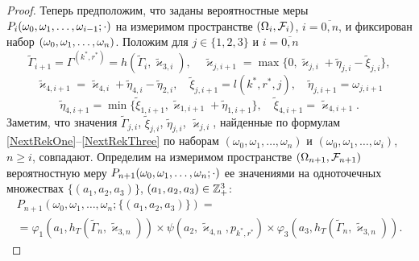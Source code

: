 \documentclass[12pt]{extarticle}
\theoremstyle{theorem}
\theoremstyle{remark}
\renewcommand*{\hm}[1]{#1\nobreak\discretionary{}%
	{\hbox{$\mathsurround=0pt #1$}}{}}%
\begin{document}
\begin{proof}
Теперь предположим, что заданы вероятностные меры $P_i(\omega_0\hm{}, \omega_1,\hm{} \ldots \hm{}, \omega_{i-1};\cdot)$ на измеримом пространстве $(\Omega_i, {\cal F}_i)$, $i=\overline{0,n}$,
и 
фиксирован набор $(\omega_0, \omega_1, \hm\ldots, \omega_{n})$. Положим для $j\in \{1, 2, 3\}$  и $i=\overline{0,n}$
\begin{equation}
\tilde{\Gamma}_{i+1}=\Gamma^{(k^*,r^*)}=h(\tilde{\Gamma}_{i},\tilde{\varkappa}_{3,i}), \quad \tilde{\varkappa}_{j,i+1}=\max\{ 0,\tilde{\varkappa}_{j,i}+\tilde{\eta}_{j,i} -\tilde{\xi}_{j,i}\},
\label{NextRekOne}
\end{equation}
\begin{equation}
\tilde{\varkappa}_{4,i+1}=\tilde{\varkappa}_{4,i}+\tilde{\eta}_{4,i}-\tilde{\eta}_{2,i}, \quad \tilde{\xi}_{j,i+1}=l(k^*,r^*,j),\quad \tilde{\eta}_{j,i+1}=\omega_{j,i+1}
\label{NextRekTwo}
\end{equation}
\begin{equation}
\tilde{\eta}_{4,i+1}=\min\{\tilde{\xi}_{1,i+1}, \tilde{\varkappa}_{1,i+1}+\tilde{\eta}_{1,i+1}\}, \quad \tilde{\xi}_{4,i+1}=\tilde{\varkappa}_{4,i+1}.
\label{NextRekThree}
\end{equation}
Заметим, что значения $\tilde{\Gamma}_{j,i}$, $\tilde\xi_{j,i}$, $\tilde\eta_{j,i}$, $\tilde\varkappa_{j,i}$, найденные по формулам \eqref{NextRekOne}--\eqref{NextRekThree} по наборам $(\omega_0, \omega_1,\ldots, \omega_n)$ и $(\omega_0, \omega_1,\ldots, \omega_i)$, $n\geqslant i$, совпадают.
Определим на измеримом пространстве $(\Omega_{n+1}, {\cal F}_{n+1})$ вероятностную меру  $P_{n+1}(\omega_0, \omega_1, \hm\ldots, \omega_n;\cdot)$
ее значениями на одноточечных множествах $\{(a_1,a_2,a_3)\}$, $(a_1,a_2,a_3)\hm\in {\mathbb Z}_+^3$:
\begin{multline}
P_{n+1}(\omega_0,\omega_1,\ldots,\omega_n;\{(a_1,a_2,a_3)\}) = \\
= \varphi_1(a_1,h_T(\tilde{\Gamma}_n,\tilde{\varkappa}_{3,n})) \times \psi(a_2,\tilde{\varkappa}_{4,n}, p_{k^*,r^*}) \times \varphi_3(a_3,h_T(\tilde{\Gamma}_n,\tilde{\varkappa}_{3,n})).
\label{probabilitiesTwo}
\end{multline}





\end{proof}
\end{document}
